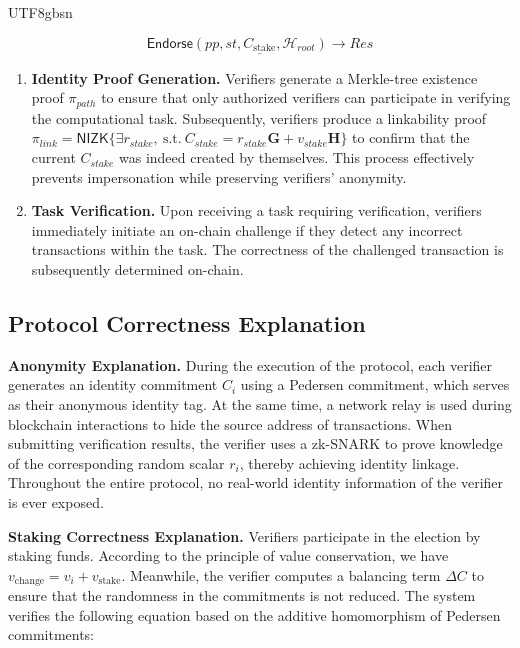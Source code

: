 \documentclass[runningheads]{llncs}
\newcommand{\nizk}{\mathsf{NIZK}}
\begin{document}
\begin{CJK*}{UTF8}{gbsn}
\vspace{-6pt}

\[
\underline{  \mathsf{Endorse} (pp, st, C_{\text{stake}}, \mathcal{H}_{root}) \rightarrow Res }
\]

\begin{enumerate}[label=(\arabic*)]
    \item \textbf{Identity Proof Generation.} Verifiers generate a Merkle-tree existence proof $\pi_{path}$ to ensure that only authorized verifiers can participate in verifying the computational task. Subsequently, verifiers produce a linkability proof $ \pi_{link} = \nizk\{ \exists r_{stake}, \ \text{s.t.} \  C_{stake} = r_{stake} \mathbf{G} + v_{stake} \mathbf{H} \} $ to confirm that the current \( C_{stake} \) was indeed created by themselves. This process effectively prevents impersonation while preserving verifiers' anonymity.
    
    \item \textbf{Task Verification.} Upon receiving a task requiring verification, verifiers immediately initiate an on-chain challenge if they detect any incorrect transactions within the task. The correctness of the challenged transaction is subsequently determined on-chain.
    

\end{enumerate}  

\subsection{Protocol Correctness Explanation}

\textbf{Anonymity Explanation.}  During the execution of the protocol, each verifier generates an identity commitment $C_i$ using a Pedersen commitment, which serves as their anonymous identity tag. At the same time, a network relay is used during blockchain interactions to hide the source address of transactions. When submitting verification results, the verifier uses a zk-SNARK to prove knowledge of the corresponding random scalar $r_i$, thereby achieving identity linkage. Throughout the entire protocol, no real-world identity information of the verifier is ever exposed.

\textbf{Staking Correctness Explanation.}  Verifiers participate in the election by staking funds. According to the principle of value conservation, we have $v_{\text{change}} = v_i + v_{\text{stake}}$. Meanwhile, the verifier computes a balancing term $\Delta C$ to ensure that the randomness in the commitments is not reduced. The system verifies the following equation based on the additive homomorphism of Pedersen commitments:


\end{CJK*}
\end{document}
